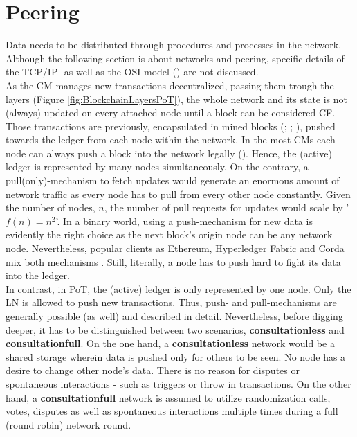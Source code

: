 \FloatBarrier

\section{Peering}
\label{sec:Peering}
Data needs to be distributed through procedures and processes in the network.
Although the following section is about networks and peering, specific details of the TCP/IP- as well as the
OSI-model (\citet{Forouzan.2003}) are not discussed. \\
As the \gls{CM} manages new transactions decentralized, passing them trough the layers (Figure \ref{fig:BlockchainLayersPoT}), the whole network and its state is not (always) updated on every attached node until a block can be considered \gls{CF}.
Those transactions are previously, encapsulated in mined blocks (\citet{Butijn.2020}; \citet{Khan.2020}; \citet{Nakamoto.2009}), pushed towards the ledger from each node within the network.
In the most \gls{CM}s each node can always push a block into the network legally (\citet{Khan.2020}).
Hence, the (active) ledger is represented by many nodes simultaneously.
On the contrary, a pull(only)-mechanism to fetch updates would generate an enormous amount of network traffic as every node has to pull from every other node constantly.
Given the number of nodes, $n$, the number of pull requests for updates would scale by '$f(n) = n^2$'.
In a binary world, using a push-mechanism for new data is evidently the right choice
as the next block's origin node can be any network node.
Nevertheless, popular clients as Ethereum, Hyperledger Fabric and Corda mix both mechanisms \cite[6]{Daniel.2019}.
Still, literally, a node has to push hard to fight its data into the ledger. \\
In contrast, in \gls{PoT}, the (active) ledger is only represented by one node.
Only the \gls{LN} is allowed to push new transactions.
Thus, push- and pull-mechanisms are generally possible (as well) and described in detail.
Nevertheless, before digging deeper, it has to be distinguished between two scenarios, \textbf{consultationless} and \textbf{consultationfull}.
On the one hand, a \textbf{consultationless} network would be a shared storage wherein data is pushed only for others to be seen.
No node has a desire to change other node's data.
There is no reason for disputes or spontaneous interactions - such as triggers or throw in transactions.
On the other hand, a \textbf{consultationfull} network is assumed to utilize randomization calls, votes,
disputes as well as spontaneous interactions multiple times during a full (round robin) network round. \\
